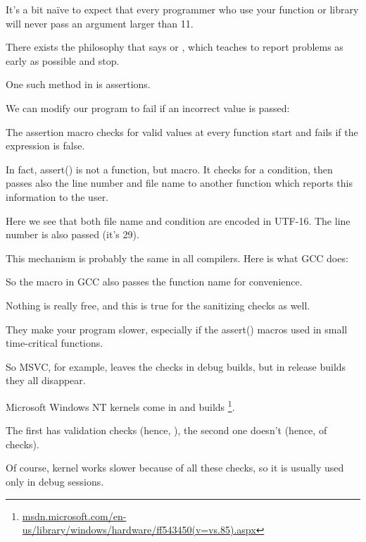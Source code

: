 It's a bit naïve to expect that every programmer who use your function or library will never pass
an argument larger than 11.

There exists the philosophy that says  or , 
which teaches to report problems as early as possible and stop.

One such method in \CCpp is assertions.

We can modify our program to fail if an incorrect value is passed:



The assertion macro checks for valid values at every function start and fails if the expression is false.



In fact, assert() is not a function, but macro. It checks for a condition, then passes also the line number and file
name to another function which reports this information to the user.

Here we see that both file name and condition are encoded in UTF-16.
The line number is also passed (it's 29).

This mechanism is probably the same in all compilers.
Here is what GCC does:



So the macro in GCC also passes the function name for convenience.

Nothing is really free, and this is true for the sanitizing checks as well.

They make your program slower, especially if the assert() macros used in small time-critical functions.

So MSVC, for example, leaves the checks in debug builds, but in release builds they all disappear.
 
Microsoft \gls{Windows NT} kernels come in  and  builds
\footnote{\href{http://go.yurichev.com/17259}{msdn.microsoft.com/en-us/library/windows/hardware/ff543450(v=vs.85).aspx}}.

The first has validation checks (hence, ), the second one doesn't (hence,  of checks).

Of course,  kernel works slower because of all these checks, so it is usually used only in debug sessions.

